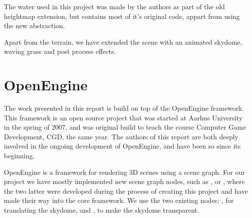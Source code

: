 The water used in this project was made by the authors as part of
the old heightmap extension, but contains most of it's original code,
appart from using the new  abstraction.

Apart from the terrain, we have extended the scene with an
animated skydome, waving grass and post process effects.



\section{OpenEngine}
The work presented in this report is build on top of the OpenEngine
framework. This framework is an open source project that was started
at Aarhus University in the spring of 2007, and was original build to
teach the course Computer Game Development, CGD, the same year. The
authors of this report are both deeply involved in the ongoing
development of OpenEngine, and have been so since its beginning.

OpenEngine is a framework for rendering 3D scenes using a scene graph.
For our project we have mostly implemented new scene graph nodes, such
as ,  or ,
where the two latter were developed during the process of creating
this project and have made their way into the core framework. We use
the two existing nodes; , for translating
the skydome, and , to make the skydome transparent.\\

